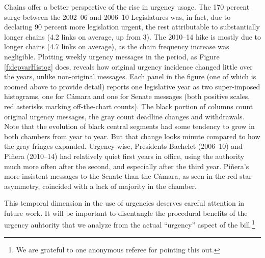 \documentclass[letter,12pt]{article}
\begin{document}
Chains offer a better perspective of the rise in urgency usage. The 170 percent surge between the 2002--06 and 2006--10 Legislatures was, in fact, due to declaring 90 percent more legislation urgent, the rest attributable to substantially longer chains (4.2 links on average, up from 3). The 2010--14 hike is mostly due to longer chains (4.7 links on average), as the chain frequency increase was negligible. Plotting weekly urgency messages in the period, as Figure \ref{f:depvarHistog} does, reveals how original urgency incidence changed little over the years, unlike non-original messages. Each panel in the figure (one of which is zoomed above to provide detail) reports one legislative year as two super-imposed histograms, one for C\'amara and one for Senate messages (both positive scales, red asterisks marking off-the-chart counts). The black portion of columns count original urgency messages, the gray count deadline changes and withdrawals. Note that the evolution of black central segments had some tendency to grow in both chambers from year to year. But that change looks minute compared to how the gray fringes expanded. Urgency-wise, Presidents Bachelet (2006--10) and Pi\~nera (2010--14) had relatively quiet first years in office, using the authority much more often after the second, and especially after the third year. Pi\~nera's more insistent messages to the Senate than the C\'amara, as seen in the red star asymmetry, coincided with a lack of majority in the chamber. 

This temporal dimension in the use of urgencies deserves careful attention in future work. It will be important to disentangle the procedural benefits of the urgency auhtority that we analyze from the actual ``urgency'' aspect of the bill.\footnote{We are grateful to one anonymous referee for pointing this out.}

\end{document}
